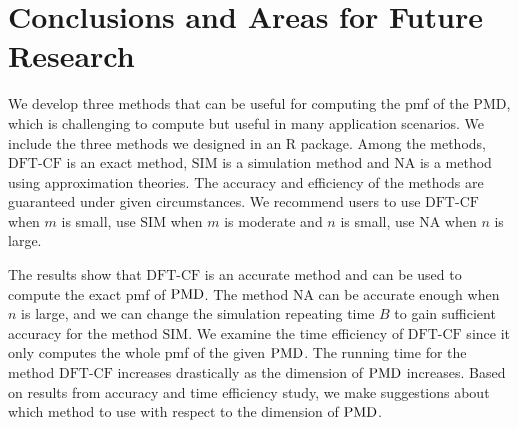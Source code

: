 \documentclass[12pt]{article}
\newcommand{\PMD}{{\normalfont\textrm{PMD}}}
\newcommand{\SIM}{{\textrm{SIM}}}
\newcommand{\NA}{{\textrm{NA}}}
\newcommand{\dft}{{\textrm{DFT-CF}}}
\begin{document}



\section{Conclusions and Areas for Future Research}\label{sec:conclusion}

We develop three methods that can be useful for computing the pmf of the PMD, which is challenging to compute but useful in many application scenarios. We include the three methods we designed in an R package. Among the methods, $\dft$ is an exact method, $\SIM$ is a simulation method and $\NA$ is a method using approximation theories. The accuracy and efficiency of the methods are guaranteed under given circumstances. We recommend users to use $\dft$ when $m$ is small, use $\SIM$ when $m$ is moderate and $n$ is small, use $\NA$ when $n$ is large.


The results show that $\dft$ is an accurate method and can be used to compute the exact pmf of $\PMD$. The method $\NA$ can be accurate enough when $n$ is large, and we can change the simulation repeating time $B$ to gain sufficient accuracy for the method $\SIM$. We examine the time efficiency of $\dft$ since it only computes the whole pmf of the given $\PMD$. The running time for the method $\dft$ increases drastically as the dimension of $\PMD$ increases. Based on results from accuracy and time efficiency study, we make suggestions about which method to use with respect to the dimension of $\PMD$.
\end{document}
